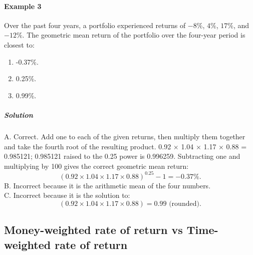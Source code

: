 \paragraph{Example 3} %
Over the past four years, a portfolio experienced returns of $-8\%$, $4\%$, $17\%$, and $-12\%$. The geometric mean return of the portfolio over the four-year period is closest to:
\begin{enumerate}[label=\Alph*.]
	\item -0.37\%.
	\item 0.25\%.
	\item 0.99\%.
\end{enumerate}
\subparagraph{Solution} %
A. Correct. Add one to each of the given returns, then multiply them together and take the fourth root of the resulting product. 0.92 × 1.04 × 1.17 × 0.88 = 0.985121; 0.985121 raised to the 0.25 power is 0.996259. Subtracting one and multiplying by 100 gives the correct geometric mean return:
\[
(0.92 \times 1.04 \times 1.17 \times 0.88)^{0.25} - 1= -0.37\%.
\]
B. Incorrect because it is the arithmetic mean of the four numbers.\\
C. Incorrect because it is the solution to:
\[
(0.92 \times 1.04 \times 1.17 \times 0.88) = 0.99 \text{ (rounded)}.
\]

\subsection{Money-weighted rate of return vs Time-weighted rate of return} %
